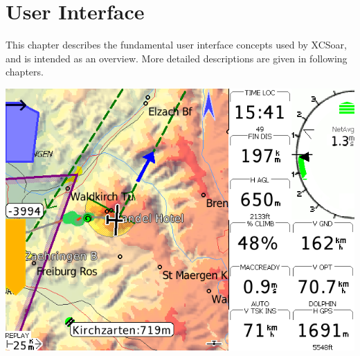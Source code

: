 \chapter{User Interface}\label{cha:interface}
This chapter describes the fundamental user interface concepts used by
XCSoar, and is intended as an overview.  More detailed descriptions
are given in following chapters.


\begin{center}
\includegraphics[angle=0,width=\linewidth,keepaspectratio='true']{figures/plain.png}
\end{center}


